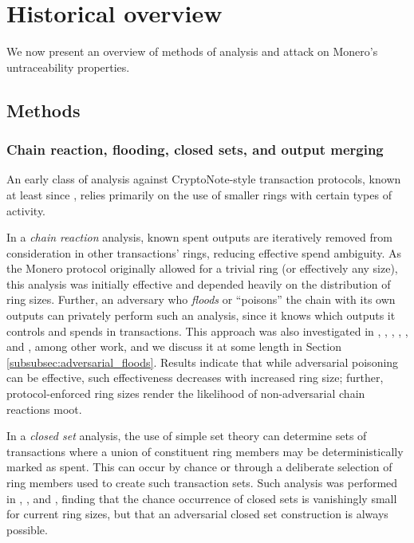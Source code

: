 \documentclass{article}
\theoremstyle{definition}
\begin{document}
\section{Historical overview}

We now present an overview of methods of analysis and attack on Monero's untraceability properties.

\subsection{Methods}


\subsubsection{Chain reaction, flooding, closed sets, and output merging}

An early class of analysis against CryptoNote-style transaction protocols, known at least since \cite{noether2014note}, relies primarily on the use of smaller rings with certain types of activity.

In a \textit{chain reaction} analysis, known spent outputs are iteratively removed from consideration in other transactions' rings, reducing effective spend ambiguity.
As the Monero protocol originally allowed for a trivial ring (or effectively any size), this analysis was initially effective and depended heavily on the distribution of ring sizes.
Further, an adversary who \textit{floods} or ``poisons'' the chain with its own outputs can privately perform such an analysis, since it knows which outputs it controls and spends in transactions.
This approach was also investigated in \cite{kumar2017traceability}, \cite{moser2017empirical}, \cite{miller2017empirical}, \cite{christensen2018comparative}, \cite{hinteregger2018monero}, and \cite{wijaya2018monero}, among other work, and we discuss it at some length in Section \ref{subsubsec:adversarial_floods}.
Results indicate that while adversarial poisoning can be effective, such effectiveness decreases with increased ring size; further, protocol-enforced ring sizes render the likelihood of non-adversarial chain reactions moot.

In a \textit{closed set} analysis, the use of simple set theory can determine sets of transactions where a union of constituent ring members may be deterministically marked as spent.
This can occur by chance or through a deliberate selection of ring members used to create such transaction sets.
Such analysis was performed in \cite{noether2018note}, \cite{hinteregger2018monero}, and \cite{yu2019new}, finding that the chance occurrence of closed sets is vanishingly small for current ring sizes, but that an adversarial closed set construction is always possible.
\end{document}
